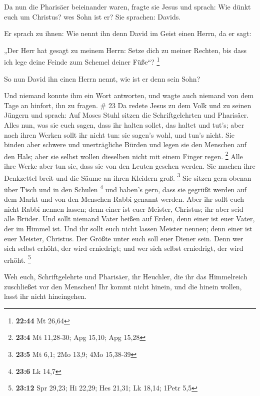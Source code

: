  Da nun die Pharisäer beieinander waren, fragte sie Jesus
 und sprach: Wie dünkt euch um Christus? wes Sohn ist er?
Sie sprachen: Davids.

 Er sprach zu ihnen: Wie nennt ihn denn David im Geist
einen Herrn, da er sagt:

 „Der Herr hat gesagt zu meinem Herrn: Setze dich zu
meiner Rechten, bis dass ich lege deine Feinde zum Schemel deiner
Füße``? \footnote{\textbf{22:44} Mt 26,64}

 So nun David ihn einen Herrn nennt, wie ist er denn sein
Sohn?

 Und niemand konnte ihm ein Wort antworten, und wagte
auch niemand von dem Tage an hinfort, ihn zu fragen. \# 23
 Da redete Jesus zu dem Volk und zu seinen Jüngern
 und sprach: Auf Moses Stuhl sitzen die Schriftgelehrten
und Pharisäer.  Alles nun, was sie euch sagen, dass ihr
halten sollet, das haltet und tut's; aber nach ihren Werken sollt ihr
nicht tun: sie sagen's wohl, und tun's nicht.  Sie binden
aber schwere und unerträgliche Bürden und legen sie den Menschen auf den
Hals; aber sie selbst wollen dieselben nicht mit einem Finger regen.
\footnote{\textbf{23:4} Mt 11,28-30; Apg 15,10; Apg 15,28}
 Alle ihre Werke aber tun sie, dass sie von den Leuten
gesehen werden. Sie machen ihre Denkzettel breit und die Säume an ihren
Kleidern groß. \footnote{\textbf{23:5} Mt 6,1; 2Mo 13,9; 4Mo 15,38-39}
 Sie sitzen gern obenan über Tisch und in den Schulen
\footnote{\textbf{23:6} Lk 14,7}  und haben's gern, dass
sie gegrüßt werden auf dem Markt und von den Menschen Rabbi genannt
werden.  Aber ihr sollt euch nicht Rabbi nennen lassen;
denn einer ist euer Meister, Christus; ihr aber seid alle Brüder.
 Und sollt niemand Vater heißen auf Erden, denn einer ist
euer Vater, der im Himmel ist.  Und ihr sollt euch nicht
lassen Meister nennen; denn einer ist euer Meister, Christus.
 Der Größte unter euch soll euer Diener sein.
 Denn wer sich selbst erhöht, der wird erniedrigt; und
wer sich selbst erniedrigt, der wird erhöht. \footnote{\textbf{23:12}
  Spr 29,23; Hi 22,29; Hes 21,31; Lk 18,14; 1Petr 5,5}

 Weh euch, Schriftgelehrte und Pharisäer, ihr Heuchler,
die ihr das Himmelreich zuschließet vor den Menschen! Ihr kommt nicht
hinein, und die hinein wollen, lasst ihr nicht hineingehen.

